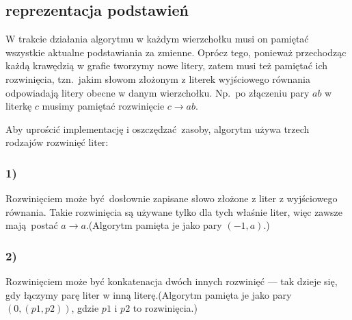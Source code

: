 \documentclass[leqno, 12pt]{article}
\begin{document}
\subsection{reprezentacja podstawień}
W trakcie działania algorytmu w każdym wierzchołku musi on pamiętać wszystkie aktualne podstawiania za zmienne. Oprócz tego, ponieważ przechodząc każdą krawędzią w grafie tworzymy nowe litery, zatem musi też pamiętać ich rozwinięcia, tzn.\ jakim słowom złożonym z literek wyjściowego równania odpowiadają litery obecne w danym wierzchołku. Np.\ po złączeniu pary $ab$ w literkę $c$ musimy pamiętać rozwinięcie $c \rightarrow ab$.


Aby uprościć implementację i oszczędzać zasoby, algorytm używa trzech rodzajów rozwinięć liter:

\subsubsection*{1)} Rozwinięciem może być dosłownie zapisane słowo złożone z liter z wyjściowego równania. Takie rozwinięcia są używane tylko dla tych właśnie liter, więc zawsze mają postać $a \rightarrow a$.\newline (Algorytm pamięta je jako pary $(-1, a)$.)

\subsubsection*{2)}
Rozwinięciem może być konkatenacja dwóch innych rozwinięć --- tak dzieje się, gdy łączymy parę liter w inną literę.\newline (Algorytm pamięta je jako pary $(0, (p1, p2))$, gdzie $p1$ i $p2$ to rozwinięcia.)
\end{document}
